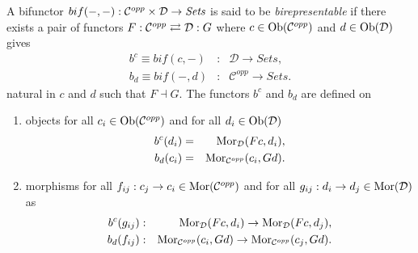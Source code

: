 
\begin{frame}
\iftoggle{thmsty}{
\begin{definition}
\label{definition-birepresentable}
}{}
A bifunctor $bif (-,-): {\mathcal C}^{opp} \times {\mathcal D} \rightarrow \textit{Sets}$ is said to be {\it birepresentable} if there exists a pair of functors $F:{\mathcal C}^{opp} \rightleftarrows {\mathcal D}:G$ where $c \in \mathop{\rm Ob}\nolimits({\mathcal C}^{opp})$ and $d \in \mathop{\rm Ob}\nolimits({\mathcal D})$ gives
\begin{eqnarray*}
b^{c} \equiv bif(c,-) &:& \mathcal{D} \rightarrow \textit{Sets},\\
b_{d} \equiv bif(-,d) &:& \mathcal{C}^{opp} \rightarrow \textit{Sets}.
\end{eqnarray*}
natural in $c$ and $d$ such that $F \dashv G$. The functors $b^{c}$ and $b_{d}$ are defined on
\begin{enumerate}
\item objects for all $c_i \in \mathop{\rm Ob}\nolimits({\mathcal C}^{opp})$ and for all $d_i \in \mathop{\rm Ob}\nolimits({\mathcal D})$
\begin{eqnarray*}
b^{c} (d_i) &=& \mathop{\rm Mor}\nolimits_{{\mathcal D}}(Fc,d_i),\\
b_{d} (c_i) &=& \mathop{\rm Mor}\nolimits_{{\mathcal C}^{opp}}(c_i,Gd).
\end{eqnarray*}
\item morphisms for all $f_{ij}:c_j \rightarrow c_i \in \mathop{\rm Mor}\nolimits({\mathcal C}^{opp})$ and for all $g_{ij}:d_i \rightarrow d_j \in \mathop{\rm Mor}\nolimits({\mathcal D})$ as
\begin{eqnarray*}
b^{c} (g_{ij}) &:& \mathop{\rm Mor}\nolimits_{{\mathcal D}}(Fc,d_i) \rightarrow \mathop{\rm Mor}\nolimits_{{\mathcal D}}(Fc,d_j),\\
b_{d} (f_{ij}) &:& \mathop{\rm Mor}\nolimits_{{\mathcal C}^{opp}}(c_i,Gd) \rightarrow \mathop{\rm Mor}\nolimits_{{\mathcal C}^{opp}}(c_j,Gd).
\end{eqnarray*}
\end{enumerate}
\iftoggle{thmsty}{
\end{definition}
}{}
\end{frame}